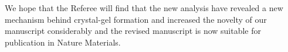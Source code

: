 \documentclass[11pt,a4paper]{article}
\begin{document}
\vskip 5mm

We hope that the Referee will find that the new analysis have revealed a new mechanism behind 
crystal-gel formation and increased the novelty of our manuscript considerably and 
the revised manuscript is now suitable for publication in Nature Materials.  

\clearpage



\end{document}
